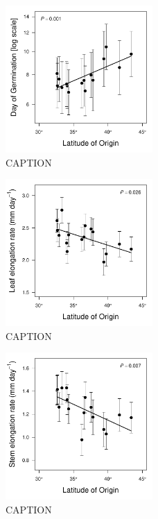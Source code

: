 \documentclass[11pt, oneside]{article}\usepackage[]{graphicx}\usepackage[]{color}
\begin{document}

\begin{figure}[h!]
	\centerline{\includegraphics[width=0.5\textwidth]{Figures/Figure_DoG_Lat.pdf}}
	\fontsize{10}{12}
	\selectfont
	\caption[Southern populations germinate sooner.]{CAPTION}
	\label{fig:Fig_DoG}
\end{figure}

\begin{figure}[h!]
	\centerline{\includegraphics[width=0.5\textwidth]{Figures/Figure_LLL_Lat.pdf}}
	\fontsize{10}{12}
	\selectfont
	\caption[Southern populations grow faster (leaf expansion rate).]{CAPTION}
	\label{fig:Fig_LLL}
\end{figure}

\begin{figure}
	\centerline{\includegraphics[width=0.5\textwidth]{Figures/Figure_Height_Lat.pdf}}
	\fontsize{10}{12}
	\selectfont
	\caption[Southern populations grow faster (stem elongation rate).]{CAPTION}
	\label{fig:Fig_height}
\end{figure}
\end{document}
